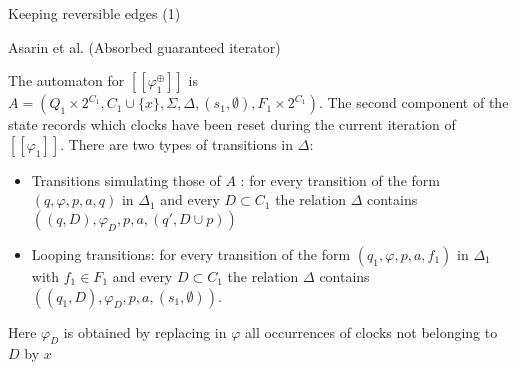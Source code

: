 \begin{frame}[fragile]{Keeping reversible edges (1)}
    \begin{definition}
        Asarin et al. (Absorbed guaranteed iterator)

        The automaton for $[\![\varphi^\oplus_1 ]\!]$ is $A = (Q_1 \times 2^{C_1}, C_1 \cup \{x\},\Sigma,\Delta,(s_1,\emptyset),F_1 \times 2^{C_1})$. The second component of the state records which clocks have been reset during the current iteration of $[\![\varphi_1]\!]$.
        There are two types of transitions in $\Delta$:
        \begin{itemize}
            \item Transitions simulating those of $A$ : for every transition of the form $(q,\varphi,p,a,q)$ in $\Delta_1$
            and every $D \subset C_1$ the relation $\Delta$ contains $((q,D),\varphi_D,p,a,(q',D\cup p))$
            \item Looping transitions: for every transition of the form $(q_1,\varphi,p,a, f_1)$ in $\Delta_1$ with $f_1 \in F_1$ and
            every $D \subset C_1$ the relation $\Delta$ contains $((q_1,D),\varphi_D,p,a,(s_1,\emptyset))$.
        \end{itemize}
        Here $\varphi_D$ is obtained by replacing in $\varphi$ all occurrences of clocks not belonging to $D$ by $x$
    \end{definition}
\end{frame}
